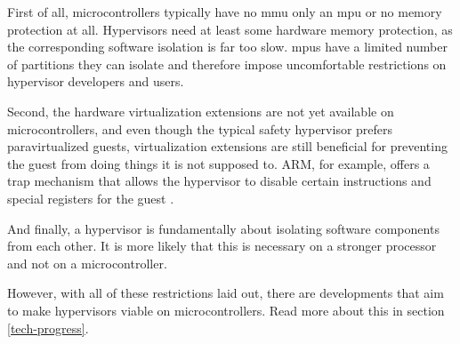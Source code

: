 First of all, microcontrollers typically have no \acrshort{mmu} only an \acrshort{mpu} or no memory protection at all. Hypervisors need at least some hardware memory protection, as the corresponding software isolation is far too slow. \acrshort{mpu}s have a limited number of partitions they can isolate and therefore impose uncomfortable restrictions on hypervisor developers and users.

Second, the hardware virtualization extensions are not yet available on microcontrollers, and even though the typical safety hypervisor prefers paravirtualized guests, virtualization extensions are still beneficial for preventing the guest from doing things it is not supposed to. ARM, for example, offers a trap mechanism that allows the hypervisor to disable certain instructions and special registers for the guest \cite{ARM.v8.2018}. 

And finally, a hypervisor is fundamentally about isolating software components from each other. It is more likely that this is necessary on a stronger processor and not on a microcontroller.

However, with all of these restrictions laid out, there are developments that aim to make hypervisors viable on microcontrollers. Read more about this in section \ref{tech-progress}.





